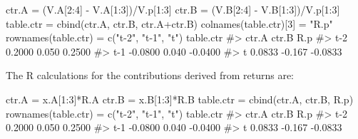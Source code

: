 \documentclass[
  letterpaper,
  DIV=11,
  numbers=noendperiod]{scrreprt}
\newenvironment{Shaded}{\begin{snugshade}}{\end{snugshade}}
\newcommand{\CommentTok}[1]{\textcolor[rgb]{0.37,0.37,0.37}{#1}}
\newcommand{\DecValTok}[1]{\textcolor[rgb]{0.68,0.00,0.00}{#1}}
\newcommand{\FunctionTok}[1]{\textcolor[rgb]{0.28,0.35,0.67}{#1}}
\newcommand{\NormalTok}[1]{\textcolor[rgb]{0.00,0.23,0.31}{#1}}
\newcommand{\OtherTok}[1]{\textcolor[rgb]{0.00,0.23,0.31}{#1}}
\newcommand{\SpecialCharTok}[1]{\textcolor[rgb]{0.37,0.37,0.37}{#1}}
\newcommand{\StringTok}[1]{\textcolor[rgb]{0.13,0.47,0.30}{#1}}
\theoremstyle{definition}
\theoremstyle{definition}
\theoremstyle{remark}
\begin{document}
\begin{Shaded}
\begin{Highlighting}[]
\NormalTok{ctr.A }\OtherTok{=}\NormalTok{ (V.A[}\DecValTok{2}\SpecialCharTok{:}\DecValTok{4}\NormalTok{] }\SpecialCharTok{{-}}\NormalTok{ V.A[}\DecValTok{1}\SpecialCharTok{:}\DecValTok{3}\NormalTok{])}\SpecialCharTok{/}\NormalTok{V.p[}\DecValTok{1}\SpecialCharTok{:}\DecValTok{3}\NormalTok{]}
\NormalTok{ctr.B }\OtherTok{=}\NormalTok{ (V.B[}\DecValTok{2}\SpecialCharTok{:}\DecValTok{4}\NormalTok{] }\SpecialCharTok{{-}}\NormalTok{ V.B[}\DecValTok{1}\SpecialCharTok{:}\DecValTok{3}\NormalTok{])}\SpecialCharTok{/}\NormalTok{V.p[}\DecValTok{1}\SpecialCharTok{:}\DecValTok{3}\NormalTok{]}
\NormalTok{table.ctr }\OtherTok{=} \FunctionTok{cbind}\NormalTok{(ctr.A, ctr.B, ctr.A}\SpecialCharTok{+}\NormalTok{ctr.B)}
\FunctionTok{colnames}\NormalTok{(table.ctr)[}\DecValTok{3}\NormalTok{] }\OtherTok{=} \StringTok{"R.p"}
\FunctionTok{rownames}\NormalTok{(table.ctr) }\OtherTok{=} \FunctionTok{c}\NormalTok{(}\StringTok{"t{-}2"}\NormalTok{, }\StringTok{"t{-}1"}\NormalTok{, }\StringTok{"t"}\NormalTok{)}
\NormalTok{table.ctr}
\CommentTok{\#\textgreater{}       ctr.A  ctr.B     R.p}
\CommentTok{\#\textgreater{} t{-}2  0.2000  0.050  0.2500}
\CommentTok{\#\textgreater{} t{-}1 {-}0.0800  0.040 {-}0.0400}
\CommentTok{\#\textgreater{} t    0.0833 {-}0.167 {-}0.0833}
\end{Highlighting}
\end{Shaded}

The R calculations for the contributions derived from returns are:

\begin{Shaded}
\begin{Highlighting}[]
\NormalTok{ctr.A }\OtherTok{=}\NormalTok{ x.A[}\DecValTok{1}\SpecialCharTok{:}\DecValTok{3}\NormalTok{]}\SpecialCharTok{*}\NormalTok{R.A}
\NormalTok{ctr.B }\OtherTok{=}\NormalTok{ x.B[}\DecValTok{1}\SpecialCharTok{:}\DecValTok{3}\NormalTok{]}\SpecialCharTok{*}\NormalTok{R.B}
\NormalTok{table.ctr }\OtherTok{=} \FunctionTok{cbind}\NormalTok{(ctr.A, ctr.B, R.p)}
\FunctionTok{rownames}\NormalTok{(table.ctr) }\OtherTok{=} \FunctionTok{c}\NormalTok{(}\StringTok{"t{-}2"}\NormalTok{, }\StringTok{"t{-}1"}\NormalTok{, }\StringTok{"t"}\NormalTok{)}
\NormalTok{table.ctr}
\CommentTok{\#\textgreater{}       ctr.A  ctr.B     R.p}
\CommentTok{\#\textgreater{} t{-}2  0.2000  0.050  0.2500}
\CommentTok{\#\textgreater{} t{-}1 {-}0.0800  0.040 {-}0.0400}
\CommentTok{\#\textgreater{} t    0.0833 {-}0.167 {-}0.0833}
\end{Highlighting}
\end{Shaded}
\end{document}
